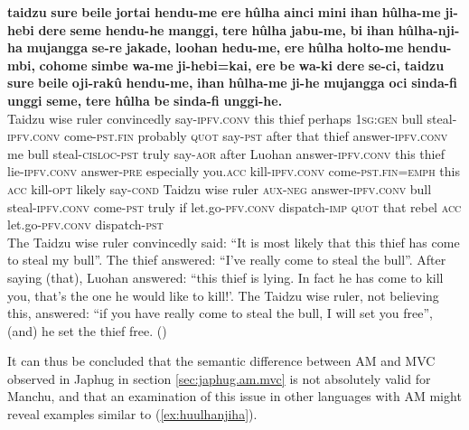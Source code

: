 \documentclass{article}
\newcommand{\ipa}[1]{\textbf{{\phon\mbox{#1}}}} %
\begin{document}
\begin{exe}
\ex \label{ex:huulhanjiha}
\gll
\ipa{taidzu} 	\ipa{sure} 	\ipa{beile} 	\ipa{jortai} 	\ipa{hendu-me} 	\ipa{ere} 	\ipa{hûlha} 	\ipa{ainci} 	\ipa{mini} 	\ipa{ihan} 	\ipa{hûlha-me} 	\ipa{ji-hebi} 	\ipa{dere} 	\ipa{seme} 	\ipa{hendu-he} 	\ipa{manggi,} 	\ipa{tere} 	\ipa{hûlha} 	\ipa{jabu-me,} 	\ipa{bi} 	\ipa{ihan} 	\ipa{hûlha-nji-ha} 	\ipa{mujangga} 	\ipa{se-re} 	\ipa{jakade,} 	\ipa{loohan} 	\ipa{hedu-me,} 	\ipa{ere} 	\ipa{hûlha} 	\ipa{holto-me} 	\ipa{hendu-mbi,} 	\ipa{cohome} 	\ipa{simbe} 	\ipa{wa-me} 	\ipa{ji-hebi=kai,} 	\ipa{ere} 	\ipa{be} 	\ipa{wa-ki} 	\ipa{dere} 	\ipa{se-ci,} 	\ipa{taidzu} 	\ipa{sure} 	\ipa{beile} 	\ipa{oji-rakû} 	\ipa{hendu-me,} 	\ipa{ihan} 	\ipa{hûlha-me} 	\ipa{ji-he} 	\ipa{mujangga} 	\ipa{oci} 	\ipa{sinda-fi} 	\ipa{unggi} 	\ipa{seme,} 	\ipa{tere} 	\ipa{hûlha} 	\ipa{be} 	\ipa{sinda-fi} 	\ipa{unggi-he.} \\
Taidzu wise ruler convincedly say-\textsc{ipfv.conv} this thief perhaps \textsc{1sg:gen} bull steal-\textsc{ipfv.conv} come-\textsc{pst.fin} probably \textsc{quot} say-\textsc{pst} after that thief answer-\textsc{ipfv.conv} me bull steal-\textsc{cisloc-pst} truly say-\textsc{aor} after Luohan answer-\textsc{ipfv.conv} this thief lie-\textsc{ipfv.conv} answer-\textsc{pre} especially you.\textsc{acc} kill-\textsc{ipfv.conv} come-\textsc{pst.fin}=\textsc{emph} this \textsc{acc} kill-\textsc{opt} likely say-\textsc{cond} Taidzu wise ruler \textsc{aux-neg} answer-\textsc{ipfv.conv} bull steal-\textsc{ipfv.conv} come-\textsc{pst} truly if let.go-\textsc{pfv.conv} dispatch-\textsc{imp} \textsc{quot} that rebel \textsc{acc} let.go-\textsc{pfv.conv} dispatch-\textsc{pst} \\
\glt The Taidzu wise ruler convincedly said: “It is most likely that this thief has come to steal my bull”. The thief answered: “I’ve really come to steal the bull”. After saying (that), Luohan answered: “this thief is lying. In fact he has come to kill you, that’s the one he would like to kill!’. The Taidzu wise ruler, not believing this, answered: “if you have really come to steal the bull, I will set you free”, (and) he set the thief free. (\citealt[35;171-172]{shunjuu92yargiyan})
\end{exe}


It can thus be concluded that the semantic difference between AM and MVC observed in Japhug in section \ref{sec:japhug.am.mvc} is not absolutely valid for Manchu, and that an examination of this issue in other languages with AM might reveal examples similar to (\ref{ex:huulhanjiha}).
\end{document}
